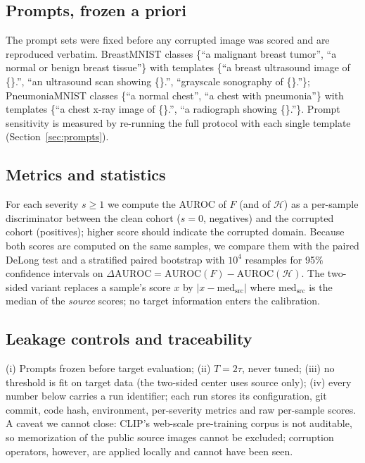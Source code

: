 \documentclass[11pt]{article}
\newcommand{\Hent}{\mathcal{H}}
\begin{document}
\subsection{Prompts, frozen a priori}

The prompt sets were fixed before any corrupted image was scored and are
reproduced verbatim. BreastMNIST classes \{``a malignant breast tumor'',
``a normal or benign breast tissue''\} with templates
\{``a breast ultrasound image of \{\}.'', ``an ultrasound scan showing \{\}.'',
``grayscale sonography of \{\}.''\};
PneumoniaMNIST classes \{``a normal chest'', ``a chest with pneumonia''\}
with templates \{``a chest x-ray image of \{\}.'',
``a radiograph showing \{\}.''\}. Prompt sensitivity is measured by re-running
the full protocol with each single template (Section~\ref{sec:prompts}).

\subsection{Metrics and statistics}

For each severity $s\ge1$ we compute the AUROC of $F$ (and of $\Hent$) as a
per-sample discriminator between the clean cohort ($s=0$, negatives) and the
corrupted cohort (positives); higher score should indicate the corrupted
domain. Because both scores are computed on the same samples, we compare them
with the paired DeLong test \citep{delong1988} and a stratified paired
bootstrap \citep{efron1994bootstrap} with $10^4$ resamples for 95\%
confidence intervals on $\Delta\mathrm{AUROC} = \mathrm{AUROC}(F) -
\mathrm{AUROC}(\Hent)$. The two-sided variant replaces a sample's score $x$ by
$|x - \mathrm{med}_{\mathrm{src}}|$ where $\mathrm{med}_{\mathrm{src}}$ is the
median of the \emph{source} scores; no target information enters the
calibration.

\subsection{Leakage controls and traceability}

(i) Prompts frozen before target evaluation; (ii) $T=2\tau$, never tuned;
(iii) no threshold is fit on target data (the two-sided center uses source
only); (iv) every number below carries a run identifier; each run stores its
configuration, git commit, code hash, environment, per-severity metrics and
raw per-sample scores. A caveat we cannot close: CLIP's web-scale pre-training
corpus is not auditable, so memorization of the public source images cannot be
excluded; corruption operators, however, are applied locally and cannot have
been seen.
\end{document}

